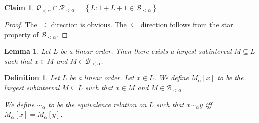 \documentclass{article}
\newtheorem{lemma}{Lemma}
\newtheorem{claim}{Claim}
\newtheorem{definition}{Definition}
\newcommand{\braces}[1]{\left\{ {#1} \right\}}
\newcommand{\setcomp}[1]{\braces{#1}}
\begin{document}
\begin{claim}
  $ \mathcal{Q}_{< \alpha} \cap \mathcal{R}_{< \alpha} = \setcomp{L : 1 + L + 1 \in \mathcal{B}_{< \alpha}}$.
\end{claim}

\begin{proof}
  The $\supseteq$ direction is obvious. The $\subseteq$ direction follows
  from the star property of $\mathcal{B}_{< \alpha}$.
\end{proof}

\begin{lemma}
  Let $L$ be a linear order. Then there exists a largest subinterval $M \subseteq L$ such that
  $x \in M$ and $M \in \mathcal{B}_{< \alpha}$.
\end{lemma}

\begin{definition}
  Let $L$ be a linear order. Let $x \in L$. We define $M_{\alpha}[x]$ to be the largest subinterval
  $M \subseteq L$ such that $x \in M$ and $M \in \mathcal{B}_{< \alpha}$.

  We define $\sim_{\alpha}$ to be the equivalence relation on $L$ such that $x \sim_{\alpha} y$ iff
  $M_{\alpha}[x] = M_{\alpha}[y]$.
\end{definition}
\end{document}
